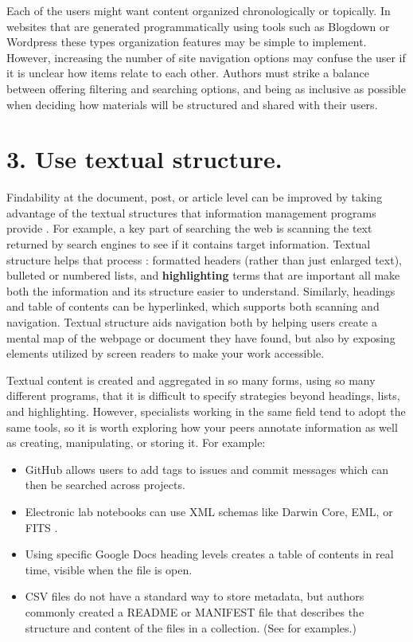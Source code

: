 \documentclass[10pt,letterpaper]{article}
\newcommand{\rulemajor}[1]{\section*{#1}}
\begin{document}
\noindent
Each of the users might want content organized chronologically or topically.
In websites that are generated programmatically using tools such as Blogdown\cite{Xie2017} 
or Wordpress \cite{Williams2015} these types organization features may be simple to implement. 
However, increasing the number of site navigation options may confuse the user if it is unclear how items relate to each other. 
Authors must strike a balance between offering filtering and searching options, 
and being as inclusive as possible when deciding how materials will be structured and shared with their users.

\rulemajor{3. Use textual structure.}

Findability at the document, post, or article level can be improved by taking
advantage of the textual structures that information management programs provide
\cite{Hedden2016}. For example, a key part of searching the web is scanning the
text returned by search engines to see if it contains target information.
Textual structure helps that process \cite{Krug2014}: formatted headers (rather
than just enlarged text), bulleted or numbered lists, and \textbf{highlighting}
terms that are important all make both the information and its structure easier
to understand. Similarly, headings and table of contents can be hyperlinked,
which supports both scanning and navigation.
Textual structure aids navigation both by helping users create a mental map of the 
webpage or document they have found, but also by exposing elements utilized by 
screen readers to make your work accessible.

Textual content is created and aggregated in so many forms, using so many
different programs, that it is difficult to specify strategies beyond headings,
lists, and highlighting. However, specialists working in the same field tend to
adopt the same tools, so it is worth exploring how your peers annotate
information as well as creating, manipulating, or storing it. For example:

\begin{itemize}

\item
  GitHub allows users to add tags to issues and commit messages which can then
  be searched across projects.

\item
  Electronic lab notebooks can use XML schemas like Darwin Core, EML, or FITS
  \cite{Briney2015}.

\item
  Using specific Google Docs heading levels creates a table of contents in real
  time, visible when the file is open.

\item
  CSV files do not have a standard way to store metadata, but authors commonly
  created a README or MANIFEST file that describes the structure and content of
  the files in a collection. (See \cite{Pudding} for examples.)

\end{itemize}
\end{document}
